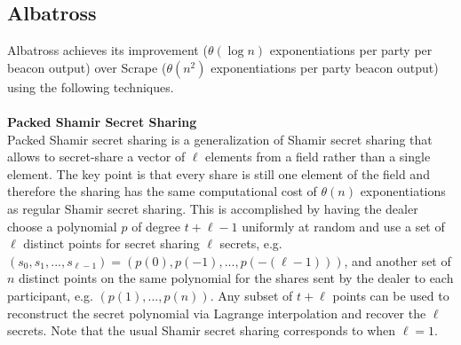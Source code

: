 \documentclass[letterpaper,twocolumn,10pt]{article}
\theoremstyle{definition}
\theoremstyle{remark}
\begin{document}
\subsection{Albatross}
\label{appendix:albatross}
Albatross achieves its improvement ($\theta(\log n)$ exponentiations per party per beacon output) over Scrape ($\theta(n^2)$ exponentiations per party beacon output) using the following techniques.\\\\
\noindent\textbf{Packed Shamir Secret Sharing} \\
Packed Shamir secret sharing is a generalization of Shamir secret sharing that allows to secret-share a vector of $\ell$ elements from a field rather than a single element. The key point is that every share is still one element of the field and therefore the sharing has the same computational cost of $\theta(n)$ exponentiations as regular Shamir secret sharing. This is accomplished by having the dealer choose a polynomial $p$ of degree $t+\ell-1$ uniformly at random and use a set of $\ell$ distinct points for secret sharing $\ell$ secrets, e.g. $(s_0, s_1, ..., s_{\ell - 1}) = (p(0), p(-1), ..., p(-(\ell - 1)))$, and another set of $n$ distinct points on the same polynomial for the shares sent by the dealer to each participant, e.g. $(p(1), ..., p(n))$. Any subset of $t+\ell$ points can be used to reconstruct the secret polynomial via Lagrange interpolation and recover the $\ell$ secrets. Note that the usual Shamir secret sharing corresponds to when $\ell = 1$.\\
\end{document}
